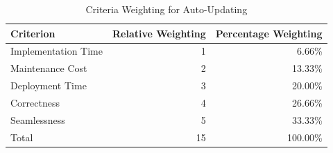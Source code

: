 \documentclass[12pt]{article}
\begin{document}
\begin{table}[ht]
\caption{Criteria Weighting for Auto-Updating}
\label{tbl:weighting-autoup}
\centering
\begin{tabular}{|l|r|r|}
    \hline
    Criterion & Relative Weighting & Percentage Weighting \\
    \hline
    \hline
    Implementation Time &  1 &   6.66\% \\
    Maintenance Cost    &  2 &  13.33\% \\
    Deployment Time     &  3 &  20.00\% \\
    Correctness         &  4 &  26.66\% \\
    Seamlessness        &  5 &  33.33\% \\
    \hline
    \hline
    Total               & 15 & 100.00\% \\
    \hline
\end{tabular}
\end{table}
\end{document}

